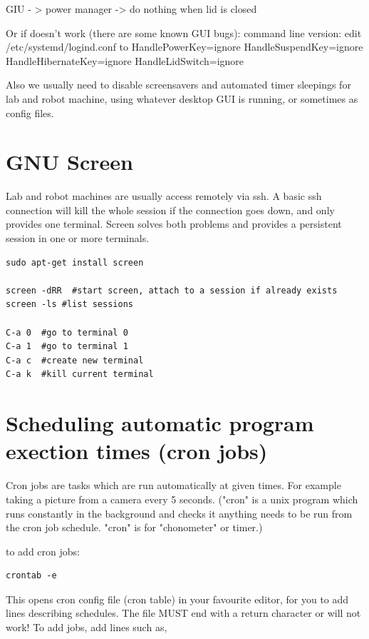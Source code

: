 \documentclass[oneside,english]{scrbook}
\begin{document}
        GIU - >  power manager -> do nothing when lid is closed

Or if doesn't work (there are some known GUI bugs): command line version:  edit /etc/systemd/logind.conf to
                        HandlePowerKey=ignore
                        HandleSuspendKey=ignore
                        HandleHibernateKey=ignore
                        HandleLidSwitch=ignore
                


Also we usually need to disable screensavers and automated timer sleepings for lab and robot machine, using whatever desktop GUI is running, or sometimes as config files.

\section{GNU Screen}
Lab and robot machines are usually access remotely via ssh.  A basic ssh connection will kill the whole session if the connection goes down, and only provides one terminal.   Screen solves both problems and provides a persistent session in one or more terminals.

\begin{lstlisting}
sudo apt-get install screen

screen -dRR  #start screen, attach to a session if already exists
screen -ls #list sessions

C-a 0  #go to terminal 0
C-a 1  #go to terminal 1
C-a c  #create new terminal
C-a k  #kill current terminal
\end{lstlisting}

\section{Scheduling automatic program exection times (cron jobs)}

Cron jobs are tasks which are run automatically at given times.  For example taking a picture from a camera every 5 seconds.  ("cron" is a unix program which runs constantly in the background and checks it anything needs to be run from the cron job schedule. "cron" is for "chonometer" or timer.)

to add cron jobs:
\begin{lstlisting}
crontab -e     
\end{lstlisting}
This opens cron config file (cron table) in your favourite editor, for you to add lines describing schedules.  The file MUST end with a return character or will not work!  To add jobs, add lines such as,
\end{document}
